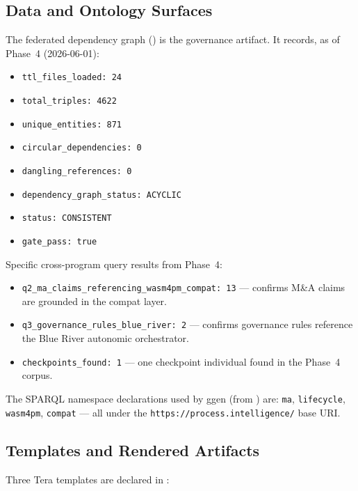 \subsection{Data and Ontology Surfaces}
\label{sec:research-open-ontologies-data-surfaces}

The federated dependency graph ()
is the governance artifact. It records, as of Phase~4 (2026-06-01):
\begin{itemize}
  \item \texttt{ttl\_files\_loaded: 24}
  \item \texttt{total\_triples: 4622}
  \item \texttt{unique\_entities: 871}
  \item \texttt{circular\_dependencies: 0}
  \item \texttt{dangling\_references: 0}
  \item \texttt{dependency\_graph\_status: ACYCLIC}
  \item \texttt{status: CONSISTENT}
  \item \texttt{gate\_pass: true}
\end{itemize}

Specific cross-program query results from Phase~4:
\begin{itemize}
  \item \texttt{q2\_ma\_claims\_referencing\_wasm4pm\_compat: 13} --- confirms M\&A
        claims are grounded in the compat layer.
  \item \texttt{q3\_governance\_rules\_blue\_river: 2} --- confirms governance rules
        reference the Blue River autonomic orchestrator.
  \item \texttt{checkpoints\_found: 1} --- one checkpoint individual found in the
        Phase~4 corpus.
\end{itemize}

The SPARQL namespace declarations used by ggen (from ) are:
\texttt{ma}, \texttt{lifecycle}, \texttt{wasm4pm}, \texttt{compat} --- all under the
\texttt{https://process.intelligence/} base URI.

\subsection{Templates and Rendered Artifacts}
\label{sec:research-open-ontologies-templates}

Three Tera templates are declared in :

